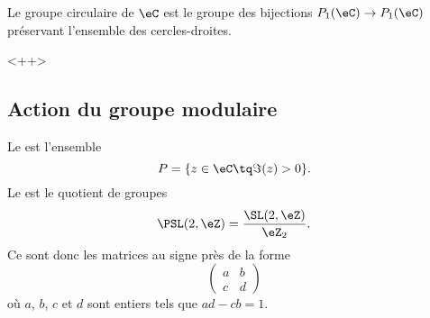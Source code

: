 \begin{theorem}
    Le groupe circulaire de \( \eC\) est le groupe des bijections \( P_1(\eC)\to P_1(\eC)\) préservant l'ensemble des cercles-droites.
\end{theorem}
<++>


\subsection{Action du groupe modulaire}

Le  est l'ensemble
\begin{equation}
    P=\{ z\in \eC\tq \Im(z)>0 \}.
\end{equation}
Le  est le quotient de groupes
\begin{equation}
    \PSL(2,\eZ)=\frac{ \SL(2,\eZ) }{ \eZ_2 }.
\end{equation}
Ce sont donc les matrices au signe près de la forme
\begin{equation}
    \begin{pmatrix}
        a    &   b    \\ 
        c    &   d    
    \end{pmatrix}
\end{equation}
où \( a\), \( b\), \( c\) et \( d\) sont entiers tels que \( ad-cb=1\).

